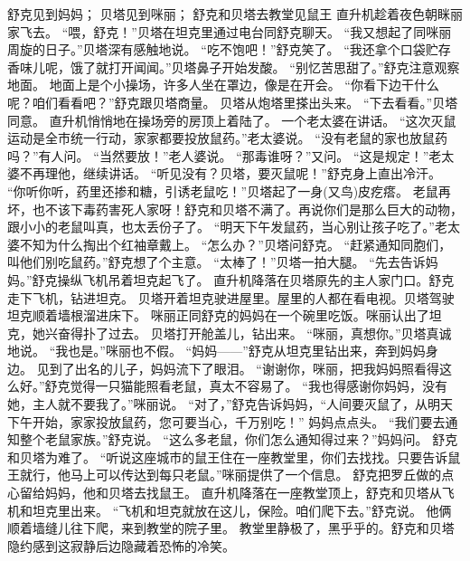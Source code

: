 \documentclass[a4paper,12pt,UTF8,twoside]{ctexbook}
\begin{document}
        舒克见到妈妈； 
        贝塔见到咪丽； 
        舒克和贝塔去教堂见鼠王   
        直升机趁着夜色朝眯丽家飞去。 
        “喂，舒克！”贝塔在坦克里通过电台同舒克聊天。 
        “我又想起了同咪丽周旋的日子。”贝塔深有感触地说。 
        “吃不饱吧！”舒克笑了。 
        “我还拿个口袋贮存香味儿呢，饿了就打开闻闻。”贝塔鼻子开始发酸。 
        “别忆苦思甜了。”舒克注意观察地面。 
        地面上是个小操场，许多人坐在罩边，像是在开会。 
        “你看下边干什么呢？咱们看看吧？”舒克跟贝塔商量。 
        贝塔从炮塔里搽出头来。 
        “下去看看。”贝塔同意。 
        直升机悄悄地在操场旁的房顶上着陆了。 
        一个老太婆在讲话。 
        “这次灭鼠运动是全市统一行动，家家都要投放鼠药。”老太婆说。 
        “没有老鼠的家也放鼠药吗？”有人问。 
        “当然要放！”老人婆说。 
        “那毒谁呀？”又问。 
        “这是规定！”老太婆不再理他，继续讲话。 
        “听见没有？贝塔，要灭鼠呢！”舒克身上直出冷汗。 
        “你听你听，药里还掺和糖，引诱老鼠吃！”贝塔起了一身(又鸟)皮疙瘩。 
        老鼠再坏，也不该下毒药害死人家呀！舒克和贝塔不满了。再说你们是那么巨大的动物，跟小小的老鼠叫真，也太丢份子了。 
        “明天下午发鼠药，当心别让孩子吃了。”老太婆不知为什么掏出个红袖章戴上。 
        “怎么办？”贝塔问舒克。 
        “赶紧通知同胞们，叫他们别吃鼠药。”舒克想了个主意。 
        “太棒了！”贝塔一拍大腿。 
        “先去告诉妈妈。”舒克操纵飞机吊着坦克起飞了。 
        直升机降落在贝塔原先的主人家门口。舒克走下飞机，钻进坦克。 
        贝塔开着坦克驶进屋里。屋里的人都在看电视。贝塔驾驶坦克顺着墙根溜进床下。 
        咪丽正同舒克的妈妈在一个碗里吃饭。咪丽认出了坦克，她兴奋得扑了过去。 
        贝塔打开舱盖儿，钻出来。 
        “咪丽，真想你。”贝塔真诚地说。 
        “我也是。”咪丽也不假。 
        “妈妈——”舒克从坦克里钻出来，奔到妈妈身边。 
        见到了出名的儿子，妈妈流下了眼泪。 
        “谢谢你，咪丽，把我妈妈照看得这么好。”舒克觉得一只猫能照看老鼠，真太不容易了。 
        “我也得感谢你妈妈，没有她，主人就不要我了。”咪丽说。 
        “对了，”舒克告诉妈妈，“人间要灭鼠了，从明天下午开始，家家投放鼠药，您可要当心，千万别吃！” 
        妈妈点点头。 
        “我们要去通知整个老鼠家族。”舒克说。 
        “这么多老鼠，你们怎么通知得过来？”妈妈问。 
        舒克和贝塔为难了。 
        “听说这座城市的鼠王住在一座教堂里，你们去找找。只要告诉鼠王就行，他马上可以传达到每只老鼠。”咪丽提供了一个信息。 
        舒克把罗丘做的点心留给妈妈，他和贝塔去找鼠王。 
        直升机降落在一座教堂顶上，舒克和贝塔从飞机和坦克里出来。 
        “飞机和坦克就放在这儿，保险。咱们爬下去。”舒克说。 
        他俩顺着墙缝儿往下爬，来到教堂的院子里。 
        教堂里静极了，黑乎乎的。舒克和贝塔隐约感到这寂静后边隐藏着恐怖的冷笑。 
\end{document}
